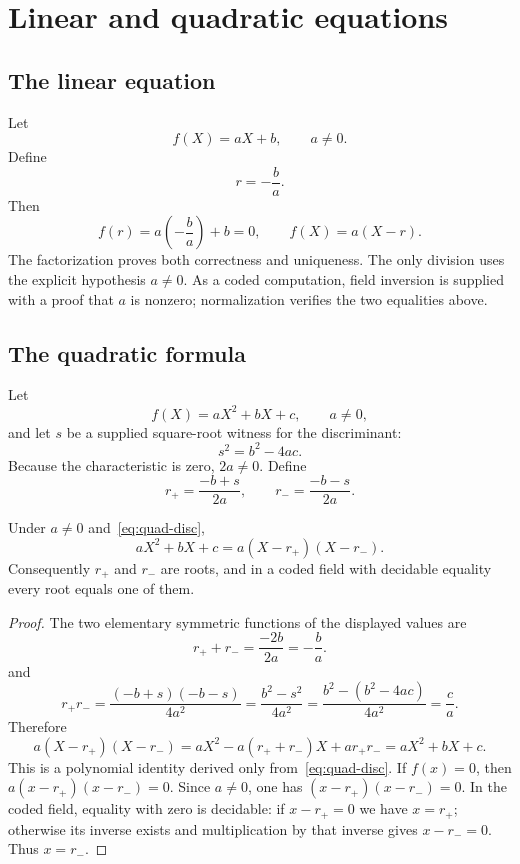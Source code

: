 \section{Linear and quadratic equations}

\subsection{The linear equation}

Let
\[
 f(X)=aX+b,
 \qquad a\ne0.
\]
Define
\[
 r=-\frac{b}{a}.
\]
Then
\[
 f(r)=a\left(-\frac ba\right)+b=0,
 \qquad
 f(X)=a(X-r).
\]
The factorization proves both correctness and uniqueness.  The only division
uses the explicit hypothesis $a\ne0$.  As a coded computation, field inversion
is supplied with a proof that $a$ is nonzero; normalization verifies the two
equalities above.

\subsection{The quadratic formula}
\label{sec:quadratic}

Let
\[
 f(X)=aX^2+bX+c,
 \qquad a\ne0,
\]
and let $s$ be a supplied square-root witness for the discriminant:
\[
 s^2=b^2-4ac.
 \tag{Q1}\label{eq:quad-disc}
\]
Because the characteristic is zero, $2a\ne0$.  Define
\[
 r_+=\frac{-b+s}{2a},
 \qquad
 r_-=\frac{-b-s}{2a}.
 \tag{Q2}\label{eq:quad-roots}
\]

\begin{theorem}
\label{thm:quadratic-factorization}
Under $a\ne0$ and~\eqref{eq:quad-disc},
\[
 aX^2+bX+c=a(X-r_+)(X-r_-).
 \tag{Q3}\label{eq:quad-factor}
\]
Consequently $r_+$ and $r_-$ are roots, and in a coded field with decidable
equality every root equals one of them.
\end{theorem}

\begin{proof}
The two elementary symmetric functions of the displayed values are
\[
 r_++r_-=
 \frac{-2b}{2a}=-\frac ba.
\]
and
\[
 r_+r_-=
 \frac{(-b+s)(-b-s)}{4a^2}
 =\frac{b^2-s^2}{4a^2}
 =\frac{b^2-(b^2-4ac)}{4a^2}
 =\frac ca.
\]
Therefore
\[
 a(X-r_+)(X-r_-)
 =aX^2-a(r_++r_-)X+a r_+r_-
 =aX^2+bX+c.
\]
This is a polynomial identity derived only from~\eqref{eq:quad-disc}.
If $f(x)=0$, then
$a(x-r_+)(x-r_-)=0$.  Since $a\ne0$, one has
$(x-r_+)(x-r_-)=0$.  In the coded field, equality with zero is decidable:
if $x-r_+=0$ we have $x=r_+$; otherwise its inverse exists and multiplication
by that inverse gives $x-r_-=0$.  Thus $x=r_-$.
\end{proof}


